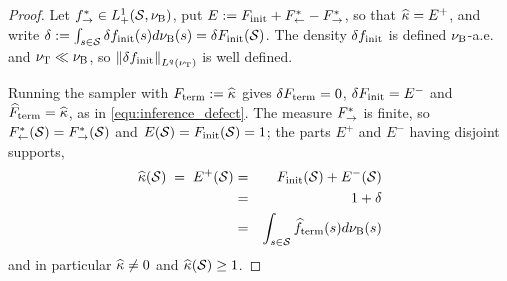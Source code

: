 \begin{proof}
    Let $f^*_{\rightarrow}\in L^1_+(\mathcal S,\nu_{\mathrm{B}})$, put $E:=F_{\mathrm{init}}+F^*_{\leftarrow}-F^*_{\rightarrow}$, so that $\widehat{\kappa} = E^+$, and write $\delta := \int_{s\in\mathcal S }\delta f_{\mathrm{init}}(s)d\nu_{\mathrm{B}}(s) = \delta F_{\mathrm{init}}(\mathcal S)$. The density $\delta f_{\mathrm{init}}$ is defined $\nu_{\mathrm{B}}$-a.e. and $\nu_{\mathrm{T}}\ll\nu_{\mathrm{B}}$, so $\left\|\delta f_{\mathrm{init}}\right\|_{L^{q}(\nu_{\mathrm{T}})}$ is well defined.

    Running the sampler with $F_{\mathrm{term}} := \widehat{\kappa}$ gives $\delta F_{\mathrm{term}} = 0$, $\delta F_{\mathrm{init}} = E^-$ and $\widehat{F}_{\mathrm{term}} = \widehat{\kappa}$, as in \eqref{equ:inference_defect}. The measure $F^*_{\rightarrow}$ is finite, so $F^*_{\leftarrow}(\mathcal S) = F^*_{\rightarrow}(\mathcal S)$ and $E(\mathcal S) = F_{\mathrm{init}}(\mathcal S) = 1$; the parts $E^+$ and $E^-$ having disjoint supports,
    \begin{eqnarray}
        \widehat{\kappa}(\mathcal S)\;=\;E^+(\mathcal S) &=& F_{\mathrm{init}}(\mathcal S)+E^-(\mathcal S) \nonumber \\
        &=&1+\delta \nonumber \\ &=& \int_{s\in \mathcal S}\widehat{f}_{\mathrm{term}}(s)d\nu_{\mathrm{B}}(s) \label{equ:il_mass_identity}
    \end{eqnarray}
    and in particular $\widehat{\kappa}\neq0$ and $\widehat{\kappa}(\mathcal S)\geq1$.


\end{proof}
